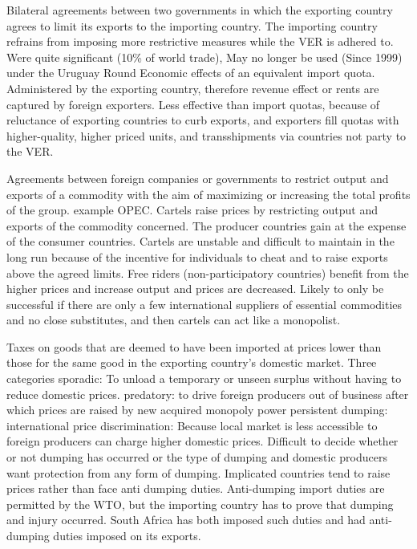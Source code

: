\documentclass[12pt]{examnotes}
\begin{document}
\ra Bilateral agreements between two governments in which the exporting country agrees to limit its exports to the importing country. 
\ra The importing country refrains from imposing more restrictive measures while the VER is adhered to.
\ra  Were quite significant (10\% of world trade), May no longer be used (Since 1999) under the Uruguay Round
\ra Economic effects of an equivalent import quota. 
\ra Administered by the exporting country, therefore revenue effect or rents are captured by foreign exporters. 
\ra Less effective than import quotas, because of reluctance of exporting countries to curb exports, and exporters fill quotas with higher-quality, higher priced units, and transshipments via countries not party to the VER.

\ra Agreements between foreign companies or governments to restrict output and exports of a commodity with the aim of maximizing or increasing the total profits of the group. 
\ra example OPEC. 
\ra Cartels raise prices by restricting output and exports of the commodity concerned.
\ra The producer countries gain at the expense of the consumer countries. 
\ra Cartels are unstable and difficult to maintain in the long run because of the incentive for individuals to cheat and to raise exports above the agreed limits. 
\ra Free riders (non-participatory countries) benefit from the higher prices and increase output and prices are decreased. 
\ra Likely to only be successful if there are only a few international suppliers of essential commodities and no close substitutes, and then cartels can act like a monopolist.

\ra Taxes on goods that are deemed to have been imported at prices lower than those for the same good in the exporting country's domestic market. 
\ra Three categories
 sporadic: To unload a temporary or unseen surplus without having to reduce domestic prices.
 predatory: to drive foreign producers out of business after which prices are raised by new acquired monopoly power
 persistent dumping: international price discrimination: Because local market is less accessible to foreign producers can charge higher domestic prices. 
\ra Difficult to decide whether or not dumping has occurred or the type of dumping and domestic producers want protection from any form of dumping.
\ra Implicated countries tend to raise prices rather than face anti dumping duties. 
\ra Anti-dumping import duties are permitted by the WTO, but the importing country has to prove that dumping and injury occurred. 
\ra South Africa has both imposed such duties and had anti-dumping duties imposed on its exports.
\end{document}
